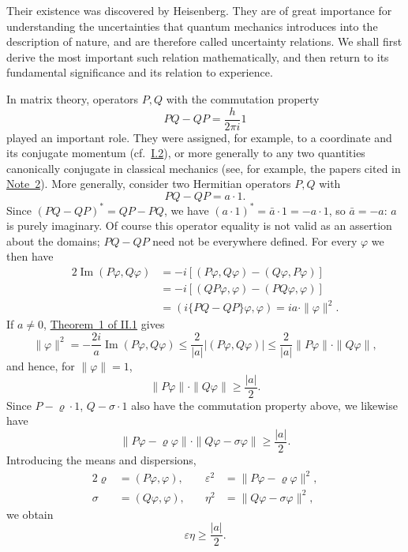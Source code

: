 \documentclass[fontsize=13pt,twoside,openany,headings=normal,parskip=false,bookmarkpackage=false,DIV=calc]{scrbook}
\begin{document}
Their existence was discovered by Heisenberg. They are of great importance for understanding the uncertainties that quantum mechanics introduces into the description of nature, and are therefore called uncertainty relations. We shall first derive the most important such relation mathematically, and then return to its fundamental significance and its relation to experience.

In matrix theory, operators $P,Q$ with the commutation property
\[
PQ-QP=\frac h{2\pi i}1
\]
played an important role. They were assigned, for example, to a coordinate and its conjugate momentum (cf.\ \hyperref[sec:I.2]{I.2}), or more generally to any two quantities canonically conjugate in classical mechanics (see, for example, the papers cited in \hyperlink{note-2}{Note~2}). More generally, consider two Hermitian operators $P,Q$ with
\[
PQ-QP=a\cdot1.
\]
Since $(PQ-QP)^*=QP-PQ$, we have $(a\cdot1)^*=\bar a\cdot1=-a\cdot1$, so $\bar a=-a$: $a$ is purely imaginary. Of course this operator equality is not valid as an assertion about the domains; $PQ-QP$ need not be everywhere defined. For every $\varphi$ we then have
\begin{align*}
2\operatorname{Im}(P\varphi,Q\varphi)
&=-i[(P\varphi,Q\varphi)-(Q\varphi,P\varphi)]\\
&=-i[(QP\varphi,\varphi)-(PQ\varphi,\varphi)]\\
&=(i\{PQ-QP\}\varphi,\varphi)=ia\cdot\|\varphi\|^2.
\end{align*}
If $a\ne0$, \hyperref[thm:II.1]{Theorem~1 of II.1} gives
\[
\|\varphi\|^2=-\frac{2i}a\operatorname{Im}(P\varphi,Q\varphi)
\le\frac2{|a|}|(P\varphi,Q\varphi)|
\le\frac2{|a|}\|P\varphi\|\cdot\|Q\varphi\|,
\]
and hence, for $\|\varphi\|=1$,
\[
\|P\varphi\|\cdot\|Q\varphi\|\ge\frac{|a|}2.
\]
Since $P-\varrho\cdot1$, $Q-\sigma\cdot1$ also have the commutation property above, we likewise have
\[
\|P\varphi-\varrho\varphi\|\cdot\|Q\varphi-\sigma\varphi\|\ge\frac{|a|}2.
\]
Introducing the means and dispersions,
\begin{alignat*}{2}
\varrho&=(P\varphi,\varphi),&\quad \varepsilon^2&=\|P\varphi-\varrho\varphi\|^2,\\
\sigma&=(Q\varphi,\varphi),&\quad \eta^2&=\|Q\varphi-\sigma\varphi\|^2,
\end{alignat*}
we obtain
\begin{equation}
\varepsilon\eta\ge\frac{|a|}2.\tag{U}\label{eq:III.4.U}
\end{equation}
\hypertarget{origpage-124}{}%
\end{document}
